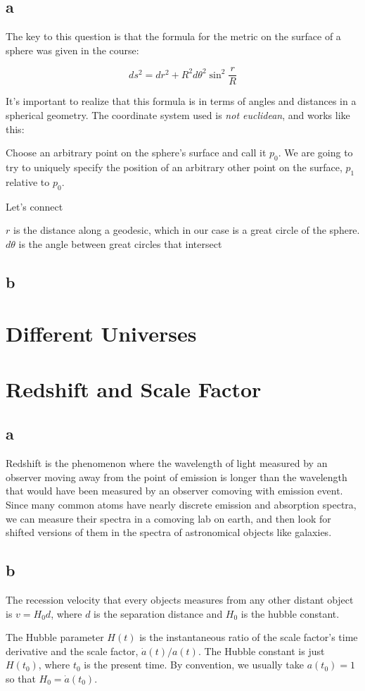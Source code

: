 \documentclass[12pt]{article}
\begin{document}
\subsection*{a}

The key to this question is that the formula for the metric on the surface of a sphere was given in the course:

\[ ds^2 = dr^2+R^2d\theta^2\sin^2\frac{r}{R}
\]

It's important to realize that this formula is in terms of angles and distances in a spherical geometry. The coordinate system used is \textit{not euclidean}, and works like this:

Choose an arbitrary point on the sphere's surface and call it \(p_0\). We are going to try to uniquely specify the position of an arbitrary other point on the surface, \(p_1\) relative to \(p_0\).

Let's connect 



\(r\) is the distance along a geodesic, which in our case is a great circle of the sphere. \(d\theta\) is the angle between great circles that intersect   

\subsection*{b}



\section{Different Universes}

\section{Redshift and Scale Factor}

\subsection*{a}

Redshift is the phenomenon where the wavelength of light measured by an observer moving away from the point of emission is longer than the wavelength that would have been measured by an observer comoving with emission event. Since many common atoms have nearly discrete emission and absorption spectra, we can measure their spectra in a comoving lab on earth, and then look for shifted versions of them in the spectra of astronomical objects like galaxies.

\subsection*{b}

The recession velocity that every objects measures from any other distant object is \(v=H_0d\), where \(d\) is the separation distance and \(H_0\) is the hubble constant.

The Hubble parameter \(H(t)\) is the instantaneous ratio of the scale factor's time derivative and the scale factor, \(\dot{a}(t)/a(t)\). The Hubble constant is just \(H(t_0)\), where \(t_0\) is the present time. By convention, we usually take \(a(t_0)=1\) so that \(H_0 = \dot{a}(t_0)\).
\end{document}

